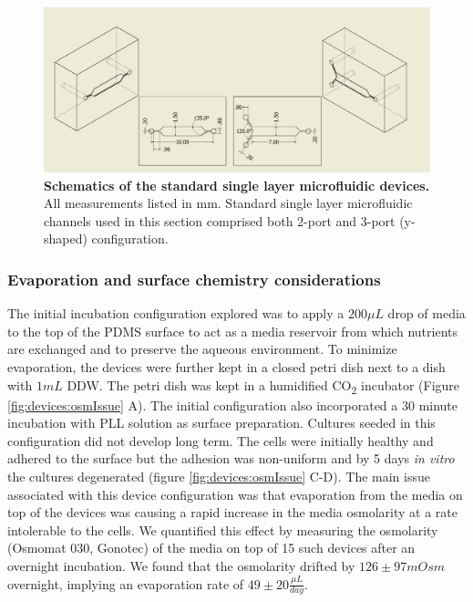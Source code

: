       \begin{figure}[h]
           \centering
            \includegraphics[width=14.5cm]{chapter4/figures/channelDimensions/dimensions.jpg}
            \caption[Schematics of the standard single layer microfluidic devices]{\textbf{Schematics of the standard single layer microfluidic devices.} All measurements listed in mm. Standard single layer microfluidic channels used in this section comprised both 2-port and 3-port (y-shaped) configuration.}
            \label{fig:devices:basicDimensions}
     \end{figure}



        \subsubsection{Evaporation and surface chemistry considerations}
        The initial incubation configuration explored was to apply a \(200 \mu L\) drop of media to the top of the PDMS surface to act as a media reservoir from which nutrients are exchanged and to preserve the aqueous environment. To minimize evaporation, the devices were further kept in a closed petri dish next to a dish with \(1 mL\) DDW. The petri dish was kept in a humidified CO\textsubscript{2} incubator (Figure \ref{fig:devices:osmIssue} A). The initial configuration also incorporated a 30 minute incubation with PLL solution as surface preparation. Cultures seeded in this configuration did not develop long term. The cells were initially healthy and adhered to the surface but the adhesion was non-uniform and by 5 days \textit{in vitro} the cultures degenerated (figure \ref{fig:devices:osmIssue} C-D). The main issue associated with this device configuration was that evaporation from the media on top of the devices was causing a rapid increase in the media osmolarity at a rate intolerable to the cells. We quantified this effect by measuring the osmolarity (Osmomat 030, Gonotec) of the media on top of 15 such devices after an overnight incubation. We found that the osmolarity drifted by \(126 \pm 97 mOsm\) overnight, implying an evaporation rate of \(49 \pm 20 \frac{\mu L}{day}\).

